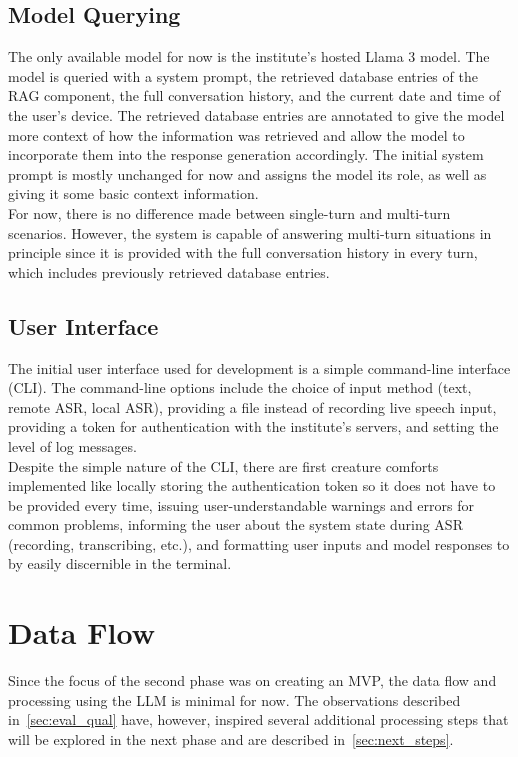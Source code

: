 \documentclass{article}
\begin{document}
\subsection{Model Querying} \label{sec:model_query}
The only available model for now is the institute's hosted Llama 3 model. The model is queried with a system prompt, the retrieved database entries of the RAG component, the full conversation history, and the current date and time of the user's device. The retrieved database entries are annotated to give the model more context of how the information was retrieved and allow the model to incorporate them into the response generation accordingly. The initial system prompt is mostly unchanged for now and assigns the model its role, as well as giving it some basic context information.\\

For now, there is no difference made between single-turn and multi-turn scenarios. However, the system is capable of answering multi-turn situations in principle since it is provided with the full conversation history in every turn, which includes previously retrieved database entries.

\subsection{User Interface}
The initial user interface used for development is a simple command-line interface (CLI). The command-line options include the choice of input method (text, remote ASR, local ASR), providing a file instead of recording live speech input, providing a token for authentication with the institute's servers, and setting the level of log messages.\\

Despite the simple nature of the CLI, there are first creature comforts implemented like locally storing the authentication token so it does not have to be provided every time, issuing user-understandable warnings and errors for common problems, informing the user about the system state during ASR (recording, transcribing, etc.), and formatting user inputs and model responses to by easily discernible in the terminal.

\section{Data Flow}
Since the focus of the second phase was on creating an MVP, the data flow and processing using the LLM is minimal for now. The observations described in~\cref{sec:eval_qual} have, however, inspired several additional processing steps that will be explored in the next phase and are described in~\cref{sec:next_steps}.\\
\end{document}

